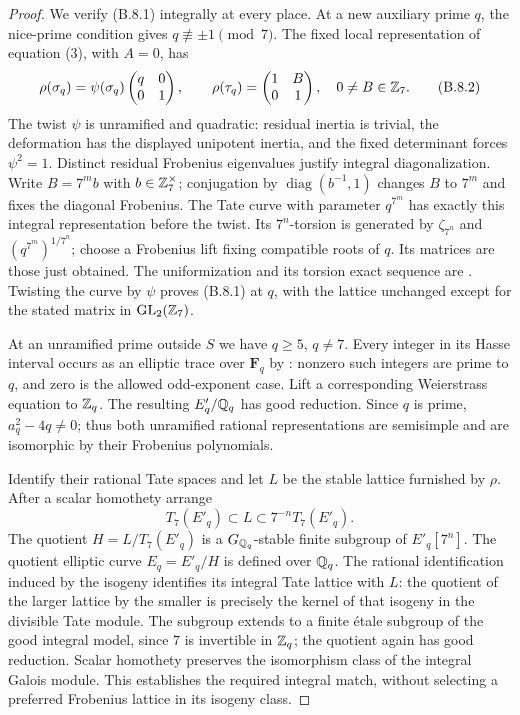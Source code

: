 \begin{proof}
We verify (B.8.1) integrally at every place.  At a new auxiliary
prime $q$, the nice-prime condition gives $q\not\equiv\pm1\pmod7$.
The fixed local representation of equation (3), with $A=0$, has
\[
 \rho(\sigma_q)=\psi(\sigma_q)
          \begin{pmatrix}q&0\\0&1\end{pmatrix},\qquad
 \rho(\tau_q)=\begin{pmatrix}1&B\\0&1\end{pmatrix},
 \quad 0\ne B\in\mathbb Z_7.                           \tag{B.8.2}
\]
The twist $\psi$ is unramified and quadratic: residual inertia is
trivial, the deformation has the displayed unipotent inertia, and
the fixed determinant forces $\psi^2=1$.  Distinct residual
Frobenius eigenvalues justify integral diagonalization.  Write
$B=7^m b$ with $b\in\mathbb Z_7^\times$; conjugation by
$\operatorname{diag}(b^{-1},1)$ changes $B$ to $7^m$ and fixes
the diagonal Frobenius.  The Tate curve with parameter $q^{7^m}$
has exactly this integral representation before the twist.
Its $7^n$-torsion is generated by $\zeta_{7^n}$ and
$(q^{7^m})^{1/7^n}$; choose a Frobenius lift fixing compatible
roots of $q$.  Its matrices are those just obtained.  The
uniformization and its torsion exact sequence are
\cite[Theorem 1 and the discussion of {$E_t[m]$}, pp.~18--19]{BIR_Tate1995}.
Twisting the curve by $\psi$ proves (B.8.1) at $q$, with the lattice
unchanged except for the stated matrix in $\mathrm{GL}_2(\mathbb Z_7)$.

At an unramified prime outside $S$ we have $q\ge5$, $q\ne7$.
Every integer in its Hasse interval occurs as an elliptic trace over
$\mathbf F_q$ by \cite[Theorem 4.1]{BIR_Waterhouse1969}:
nonzero such integers are prime to $q$, and zero is the allowed
odd-exponent case.  Lift a corresponding Weierstrass equation to
$\mathbb Z_q$.  The resulting $E'_q/\mathbb Q_q$ has good reduction.
Since $q$ is prime, $a_q^2-4q\ne0$; thus both unramified rational
representations are semisimple and are isomorphic by their
Frobenius polynomials.

Identify their rational Tate spaces and let $L$ be the stable
lattice furnished by $\rho$.  After a scalar homothety arrange
\[
 T_7(E'_q)\subset L\subset7^{-n}T_7(E'_q).
\]
The quotient $H=L/T_7(E'_q)$ is a $G_{\mathbb Q_q}$-stable finite
subgroup of $E'_q[7^n]$.  The quotient elliptic curve $E_q=E'_q/H$
is defined over $\mathbb Q_q$.  The rational identification induced by
the isogeny identifies its integral Tate lattice with $L$:
the quotient of the larger lattice by the smaller is precisely
the kernel of that isogeny in the divisible Tate module.
The subgroup extends to a finite \'etale subgroup of the good
integral model, since $7$ is invertible in $\mathbb Z_q$; the quotient
again has good reduction.  Scalar homothety preserves the
isomorphism class of the integral Galois module.  This establishes
the required integral match, without selecting a preferred
Frobenius lattice in its isogeny class.


\end{proof}
